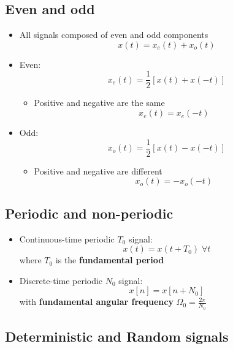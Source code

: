 \documentclass[conference]{IEEEtran}
\begin{document}
\subsection{Even and odd}

\begin{itemize}
  \item All signals composed of even and odd components
  $$
    x(t) = x_e(t) + x_o(t)
  $$

  \item Even:
  $$
    x_e(t) = \frac{1}{2}[x(t) + x(-t)]
  $$
  \begin{itemize}
    \item Positive and negative are the same
    $$
      x_e(t) = x_e(-t)
    $$
  \end{itemize}

  \item Odd:
  $$
    x_o(t) = \frac{1}{2}[x(t) - x(-t)]
  $$
  \begin{itemize}
    \item Positive and negative are different
    $$
      x_o(t) = -x_o(-t)
    $$
  \end{itemize}
\end{itemize}

\subsection{Periodic and non-periodic}

\begin{itemize}
  \item Continuous-time periodic $T_0$ signal:
  $$
    x(t) = x(t + T_0) \; \forall t
  $$
  where $T_0$ is the \textbf{fundamental period}

  \item Discrete-time periodic $N_0$ signal:
  $$
    x[n] = x[n + N_0]
  $$
  with \textbf{fundamental angular frequency} $\Omega_0 = \frac{2\pi}{N_0}$
  
\end{itemize}

\subsection{Deterministic and Random signals}
\end{document}
